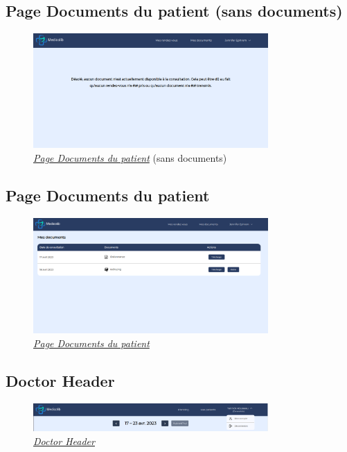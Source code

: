 \documentclass[a4paper]{report}
\begin{document}
\subsection{Page Documents du patient (sans documents)}
\begin{figure}[H]
    \vspace{-10pt}
    \centering
    \includegraphics[width=0.8\textwidth]{captures/no-document.png}
    \caption{\textit{\hyperref[documents]{Page Documents du patient}} (sans documents)}
    \label{fig:DCU20}
\end{figure}

\subsection{Page Documents du patient}
\begin{figure}[H]
    \vspace{-10pt}
    \centering
    \includegraphics[width=0.8\textwidth]{captures/patient-document.png}
    \caption{\textit{\hyperref[documents]{Page Documents du patient}}}
    \label{fig:DCU21}
\end{figure}

\subsection{Doctor Header}
\begin{figure}[H]
    \vspace{-10pt}
    \centering
    \includegraphics[width=0.8\textwidth]{captures/doctor-header.png}
    \caption{\textit{\hyperref[header2]{Doctor Header}}}
    \label{fig:DCU22}
\end{figure}
\end{document}
